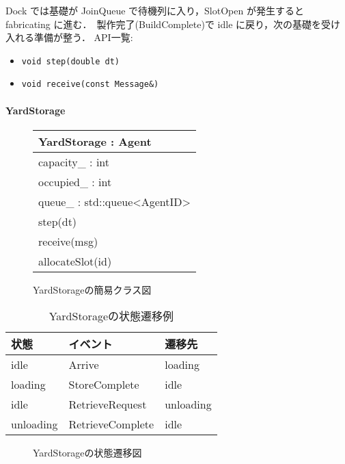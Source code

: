 \documentclass[10pt,letterpaper]{jsarticle}
\begin{document}
Dock では基礎が JoinQueue で待機列に入り，SlotOpen が発生すると fabricating に進む．\
製作完了(BuildComplete)で idle に戻り，次の基礎を受け入れる準備が整う．
API一覧:
\begin{itemize}
  \item \texttt{void step(double dt)}
  \item \texttt{void receive(const Message\&)}
\end{itemize}

\paragraph{YardStorage}
\begin{figure}[htbp]
  \centering
  \begin{tabular}{|l|}
    \hline
    \textbf{YardStorage} : Agent \\
    \hline
    capacity\_ : int \\
    occupied\_ : int \\
    queue\_ : std::queue\textless AgentID\textgreater \\
    \hline
    step(dt) \\
    receive(msg) \\
    allocateSlot(id) \\
    \hline
  \end{tabular}
  \caption{YardStorageの簡易クラス図}
\end{figure}
\begin{table}[htbp]
  \centering
  \begin{tabular}{lll}
    \toprule
    状態 & イベント & 遷移先 \\
    \midrule
    idle & Arrive & loading \\
    loading & StoreComplete & idle \\
    idle & RetrieveRequest & unloading \\
    unloading & RetrieveComplete & idle \\
    \bottomrule
  \end{tabular}
  \caption{YardStorageの状態遷移例}
\end{table}
\begin{figure}[htbp]
  \centering
  \caption{YardStorageの状態遷移図}
\end{figure}
\end{document}
